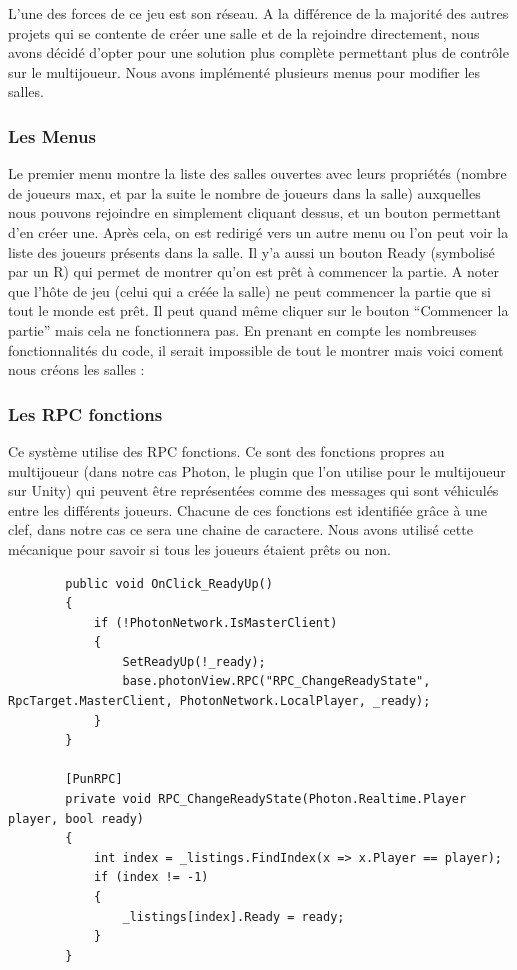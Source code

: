 \documentclass{article}
\begin{document}
L’une des forces de ce jeu est son réseau. A la différence de la majorité des autres projets qui se contente de créer une salle et de la rejoindre directement, nous avons décidé d’opter pour une solution plus complète permettant plus de contrôle sur le multijoueur. Nous avons implémenté plusieurs menus pour modifier les salles.

\subsubsection{Les Menus}

Le premier menu montre la liste des salles ouvertes avec leurs propriétés (nombre de joueurs max, et par la suite le nombre de joueurs dans la salle) auxquelles nous pouvons rejoindre en simplement cliquant dessus, et un bouton permettant d’en créer une.
Après cela, on est redirigé vers un autre menu ou l’on peut voir la liste des joueurs présents dans la salle. Il y’a aussi un bouton Ready (symbolisé par un R) qui permet de montrer qu’on est prêt à commencer la partie. A noter que l’hôte de jeu (celui qui a créée la salle) ne peut commencer la partie que si tout le monde est prêt. Il peut quand même cliquer sur le bouton “Commencer la partie” mais cela ne fonctionnera pas. En prenant en compte les nombreuses fonctionnalités du code, il serait impossible de tout le montrer mais voici coment nous créons les salles : 

\subsubsection{Les RPC fonctions}

Ce système utilise des RPC fonctions. Ce sont des fonctions propres au multijoueur (dans notre cas Photon, le plugin que l’on utilise pour le multijoueur sur Unity) qui peuvent être représentées comme des messages qui sont véhiculés entre les différents joueurs. Chacune de ces fonctions est identifiée grâce à une clef, dans notre cas ce sera une chaine de caractere. Nous avons utilisé cette mécanique pour savoir si tous les joueurs étaient prêts ou non.

\newpage
\begin{lstlisting}
        public void OnClick_ReadyUp()
        {
            if (!PhotonNetwork.IsMasterClient)
            {
                SetReadyUp(!_ready);
                base.photonView.RPC("RPC_ChangeReadyState", RpcTarget.MasterClient, PhotonNetwork.LocalPlayer, _ready);
            }
        }
        
        [PunRPC]
        private void RPC_ChangeReadyState(Photon.Realtime.Player player, bool ready)
        {
            int index = _listings.FindIndex(x => x.Player == player);
            if (index != -1)
            {
                _listings[index].Ready = ready;
            }
        }
\end{lstlisting}
\end{document}
